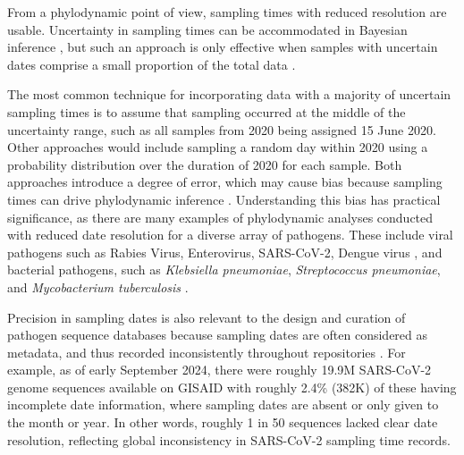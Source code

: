 \documentclass[12pt]{article}
\begin{document}
\begin{spacing}{2}
From a phylodynamic point of view, sampling times with reduced resolution are usable. Uncertainty in sampling times can be accommodated in Bayesian inference \citep{shapiro2011bayesian}, but such an approach is only effective when samples with uncertain dates comprise a small proportion of the total data \citep{rieux2017tipdatingbeast}.

The most common technique for incorporating data with a majority of uncertain sampling times is to assume that sampling occurred at the middle of the uncertainty range, such as all samples from 2020 being assigned 15 June 2020. Other approaches would include sampling a random day within 2020 using a probability distribution over the duration of 2020 for each sample. Both approaches introduce a degree of error, which may cause bias because sampling times can drive phylodynamic inference \citep{featherstone_decoding_2023,featherstone_infectious_2021,volz_sampling_2014}. Understanding this bias has practical significance, as there are many examples of phylodynamic analyses conducted with reduced date resolution for a diverse array of pathogens. These include viral pathogens such as Rabies Virus, Enterovirus, SARS-CoV-2, Dengue virus \citep{talbi_phylodynamics_2010,xiao_genomic_2022,wolf_temporal_2022,bennett_epidemic_2010}, and bacterial pathogens, such as \textit{Klebsiella pneumoniae}, \textit{Streptococcus pneumoniae}, and \textit{Mycobacterium tuberculosis} \citep{cella_multi-drug_2017,azarian_impact_2018,merker_evolutionary_2015}. 

Precision in sampling dates is also relevant to the design and curation of pathogen sequence databases because sampling dates are often considered as metadata, and thus recorded inconsistently throughout repositories \citep{raza2016big}. For example, as of early September 2024, there were roughly 19.9M SARS-CoV-2 genome sequences available on GISAID with roughly 2.4\% (382K) of these having incomplete date information, where sampling dates are absent or only given to the month or year. In other words, roughly 1 in 50 sequences lacked clear date resolution, reflecting global inconsistency in SARS-CoV-2 sampling time records.


\end{spacing}
\end{document}
